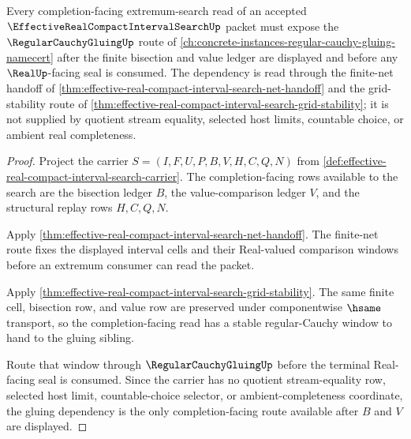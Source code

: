 \begin{theorem}
\label{thm:effective-real-compact-interval-search-regular-cauchy-gluing-dependency}
Every completion-facing extremum-search read of an accepted $\EffectiveRealCompactIntervalSearchUp$ packet must expose the $\RegularCauchyGluingUp$ route of \autoref{ch:concrete-instances-regular-cauchy-gluing-namecert} after the finite bisection and value ledger are displayed and before any $\RealUp$-facing seal is consumed. The dependency is read through the finite-net handoff of \autoref{thm:effective-real-compact-interval-search-net-handoff} and the grid-stability route of \autoref{thm:effective-real-compact-interval-search-grid-stability}; it is not supplied by quotient stream equality, selected host limits, countable choice, or ambient real completeness.
\end{theorem}
\begin{proof}
Project the carrier $S=(I,F,U,P,B,V,H,C,Q,N)$ from \autoref{def:effective-real-compact-interval-search-carrier}. The completion-facing rows available to the search are the bisection ledger $B$, the value-comparison ledger $V$, and the structural replay rows $H,C,Q,N$.

Apply \autoref{thm:effective-real-compact-interval-search-net-handoff}. The finite-net route fixes the displayed interval cells and their Real-valued comparison windows before an extremum consumer can read the packet.

Apply \autoref{thm:effective-real-compact-interval-search-grid-stability}. The same finite cell, bisection row, and value row are preserved under componentwise $\hsame$ transport, so the completion-facing read has a stable regular-Cauchy window to hand to the gluing sibling.

Route that window through $\RegularCauchyGluingUp$ before the terminal Real-facing seal is consumed. Since the carrier has no quotient stream-equality row, selected host limit, countable-choice selector, or ambient-completeness coordinate, the gluing dependency is the only completion-facing route available after $B$ and $V$ are displayed.
\end{proof}


